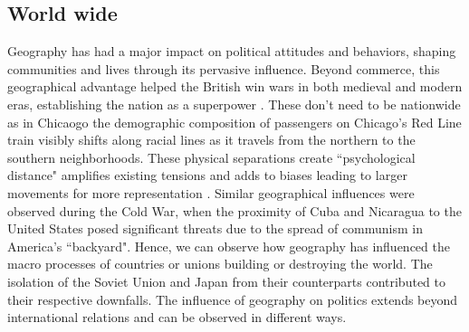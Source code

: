 \subsection{World wide}
\label{mountainww}
Geography has had a major impact on political attitudes and behaviors, shaping communities and lives through its pervasive influence. Beyond commerce, this geographical advantage helped the British win wars in both medieval and modern eras, establishing the nation as a superpower \citep{young1987geography}. These don't need to be nationwide as in Chicaogo the demographic composition of passengers on Chicago's Red Line train visibly shifts along racial lines as it travels from the northern to the southern neighborhoods.  These physical separations create ``psychological distance" amplifies existing tensions and adds to biases leading to larger movements for more representation \citep{kasperson1965toward}. Similar geographical influences were observed during the Cold War, when the proximity of Cuba and Nicaragua to the United States posed significant threats due to the spread of communism in America's ``backyard". Hence, we can observe how geography has influenced the macro processes of countries or unions building or destroying the world.  The isolation of the Soviet Union and Japan from their counterparts contributed to their respective downfalls. The influence of geography on politics extends beyond international relations and can be observed in different ways.

\vspace{0.3cm}

